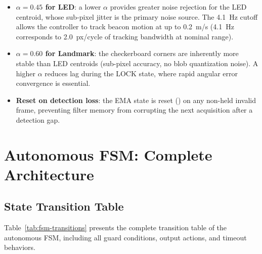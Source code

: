 \begin{itemize}[leftmargin=1.4em]
  \item \textbf{$\alpha=0.45$ for LED}: a lower $\alpha$ provides greater noise rejection for the LED centroid, whose sub-pixel jitter is the primary noise source. The 4.1~Hz cutoff allows the controller to track beacon motion at up to 0.2~m/s (4.1~Hz corresponds to 2.0~px/cycle of tracking bandwidth at nominal range).
  \item \textbf{$\alpha=0.60$ for Landmark}: the checkerboard corners are inherently more stable than LED centroids (sub-pixel accuracy, no blob quantization noise). A higher $\alpha$ reduces lag during the LOCK state, where rapid angular error convergence is essential.
  \item \textbf{Reset on detection loss}: the EMA state is reset () on any non-held invalid frame, preventing filter memory from corrupting the next acquisition after a detection gap.
\end{itemize}

\section{Autonomous FSM: Complete Architecture}

\subsection{State Transition Table}

Table~\ref{tab:fsm-transitions} presents the complete transition table of the autonomous FSM, including all guard conditions, output actions, and timeout behaviors.


